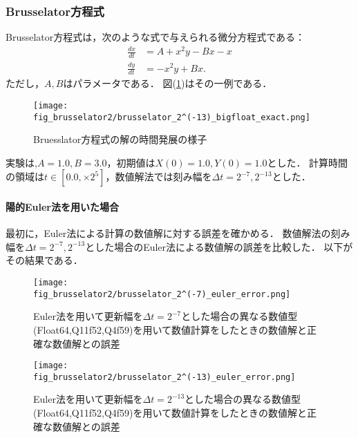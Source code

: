 \subsubsection{Brusselator方程式}
Brusselator方程式は，次のような式で与えられる微分方程式である：
\begin{align}
    \frac{dx}{dt} &= A + x^2y - Bx - x\\
    \frac{dy}{dt} &= -x^2y + Bx.
\end{align}
ただし，$A,B$はパラメータである．
図(\ref{fig:brusselator})はその一例である．
\begin{figure}[H]
    \centering
    \begin{minipage}[b]{0.9\columnwidth}
            \texttt{[image: fig\_brusselator2/brusselator\_2^(-13)\_bigfloat\_exact.png]}
    \end{minipage}
    \caption{Bruesslator方程式の解の時間発展の様子}
    \label{fig:brusselator}
\end{figure}
実験は,$A=1.0, B=3.0$，初期値は$X(0) = 1.0, Y(0) = 1.0$とした．
計算時間の領域は$t \in [0.0, \times 2^5]$，数値解法では刻み幅を$\Delta t =  2^{-7}, 2^{-13}$とした．
\paragraph*{陽的Euler法を用いた場合}
最初に，Euler法による計算の数値解に対する誤差を確かめる．
数値解法の刻み幅を$\Delta t = 2^{-7},2^{-13}$とした場合のEuler法による数値解の誤差を比較した．
以下がその結果である．
\begin{figure}[H]
    \centering
    \begin{minipage}[b]{0.49\columnwidth}
        \centering
        \texttt{[image: fig\_brusselator2/brusselator\_2^(-7)\_euler\_error.png]}
        \caption{Euler法を用いて更新幅を$\Delta t = 2^{-7}$とした場合の異なる数値型(Float64,Q11f52,Q4f59)を用いて数値計算をしたときの数値解と正確な数値解との誤差}
        \label{fig:brusselator_2^(-7)_euler_error}
    \end{minipage}
    \begin{minipage}[b]{0.49\columnwidth}
        \centering
        \texttt{[image: fig\_brusselator2/brusselator\_2^(-13)\_euler\_error.png]}
        \caption{Euler法を用いて更新幅を$\Delta t =  2^{-13}$とした場合の異なる数値型(Float64,Q11f52,Q4f59)を用いて数値計算をしたときの数値解と正確な数値解との誤差}
        \label{fig:brusselator_2^(-13)_euler_error}
    \end{minipage}
\end{figure}

